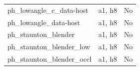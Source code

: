 \begin{longtable}{>{\raggedright\arraybackslash}p{.47\linewidth}>{\raggedright\arraybackslash}p{.25\linewidth}l}
ph\_\allowbreak{}lowangle\_\allowbreak{}c\_\allowbreak{}data-host & %
a1, h8 & %
No \\ %

ph\_\allowbreak{}lowangle\_\allowbreak{}data-host & %
a1, h8 & %
No \\ %

ph\_\allowbreak{}staunton\_\allowbreak{}blender & %
a1, h8 & %
No \\ %

ph\_\allowbreak{}staunton\_\allowbreak{}blender\_\allowbreak{}low & %
a1, h8 & %
No \\ %

ph\_\allowbreak{}staunton\_\allowbreak{}blender\_\allowbreak{}occl & %
a1, h8 & %
No \\ %


\end{longtable}
